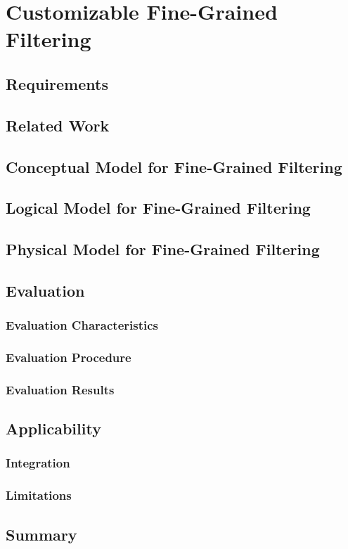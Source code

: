\chapter{Customizable Fine-Grained Filtering}
\label{chap:componentFiltering}

\section{Requirements}

\section{Related Work}


\section{Conceptual Model for Fine-Grained Filtering}

\section{Logical Model for Fine-Grained Filtering}

\section{Physical Model for Fine-Grained Filtering}

\section{Evaluation}


\subsection{Evaluation Characteristics}
\subsection{Evaluation Procedure}
\subsection{Evaluation Results}


\section{Applicability}

\subsection{Integration}

\subsection{Limitations}

\section{Summary}